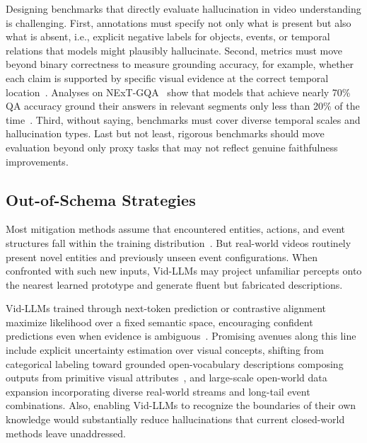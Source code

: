 \documentclass[10pt]{article} %
\begin{document}
Designing benchmarks that directly evaluate hallucination in video understanding is challenging. First, annotations must specify not only what is present but also what is absent, i.e., explicit negative labels for objects, events, or temporal relations that models might plausibly hallucinate. Second, metrics must move beyond binary correctness to measure grounding accuracy, for example, whether each claim is supported by specific visual evidence at the correct temporal location~\citep{Xiao2023CanIT, Guo2024TRACETG}. Analyses on NExT-GQA~\citep{xiao2024can} show that models that achieve nearly 70\% QA accuracy ground their answers in relevant segments only less than 20\% of the time~\citep{Xiao2023CanIT}. Third, without saying, benchmarks must cover diverse temporal scales and hallucination types.
Last but not least, rigorous benchmarks should move evaluation beyond only proxy tasks that may not reflect genuine faithfulness improvements.

\subsection{Out-of-Schema Strategies }
Most mitigation methods assume that encountered entities, actions, and event structures fall within the training distribution~\citep{Maaz2023VideoChatGPTTD, Chen2024ShareGPT4VideoIV}. But real-world videos routinely present novel entities and previously unseen event configurations. When confronted with such new inputs, Vid-LLMs may project unfamiliar percepts onto the nearest learned prototype and generate fluent but fabricated descriptions.

Vid-LLMs trained through next-token prediction or contrastive alignment maximize likelihood over a fixed semantic space, encouraging confident predictions even when evidence is ambiguous~\citep{Li2024TOPAEL, Lin2023VideoLLaVALU}. Promising avenues along this line include explicit uncertainty estimation over visual concepts, shifting from categorical labeling toward grounded open-vocabulary descriptions composing outputs from primitive visual attributes~\citep{Wasim2023VideoGroundingDINOTO, Munasinghe2024VideoGLaMMA}, and large-scale open-world data expansion incorporating diverse real-world streams and long-tail event combinations.
Also, enabling Vid-LLMs to recognize the boundaries of their own knowledge would substantially reduce hallucinations that current closed-world methods leave unaddressed.
\end{document}
